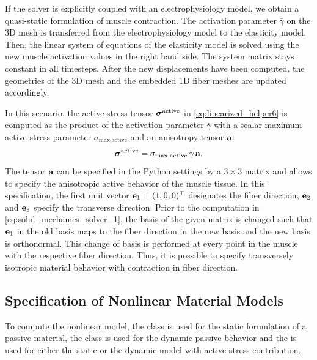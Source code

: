 If the solver is explicitly coupled with an electrophysiology model, we obtain a quasi-static formulation of muscle contraction. The activation parameter $\bar{\gamma}$ on the 3D mesh is transferred from the electrophysiology model to the elasticity model.
Then, the linear system of equations of the elasticity model is solved using the new muscle activation values in the right hand side. The system matrix stays constant in all timesteps. After the new displacements have been computed, the geometries of the 3D mesh and the embedded 1D fiber meshes are updated accordingly.

In this scenario, the active stress tensor $\boldsymbol{\sigma}^\text{active}$ in \cref{eq:linearized_helper6} is computed as the product of the activation parameter $\bar{\gamma}$ with a scalar maximum active stress parameter $\sigma_\text{max,active}$ and an anisotropy tensor $\textbf{a}$:
\begin{align}\label{eq:solid_mechanics_solver_1}
  \boldsymbol{\sigma}^\text{active} = \sigma_\text{max,active} \,\bar{\gamma}\,\textbf{a}.
\end{align}
The tensor $\textbf{a}$ can be specified in the Python settings by a $3 \times 3$ matrix and allows to specify the anisotropic active behavior of the muscle tissue. In this specification, the first unit vector $\textbf{e}_1=(1,0,0)^\top$ designates the fiber direction, $\textbf{e}_2$ and $\textbf{e}_3$ specify the transverse direction. Prior to the computation in \cref{eq:solid_mechanics_solver_1}, the basis of the given matrix is changed such that $\textbf{e}_1$ in the old basis maps to the fiber direction in the new basis and the new basis is orthonormal. This change of basis is performed at every point in the muscle with the respective fiber direction. Thus, it is possible to specify transversely isotropic material behavior with contraction in fiber direction.

\subsection{Specification of Nonlinear Material Models}\label{sec:specification_of_nonlinear_ma}

To compute the nonlinear model, the  class is used for the static formulation of a passive material, the  class is used for the dynamic passive behavior and the  is used for either the static or the dynamic model with active stress contribution.

